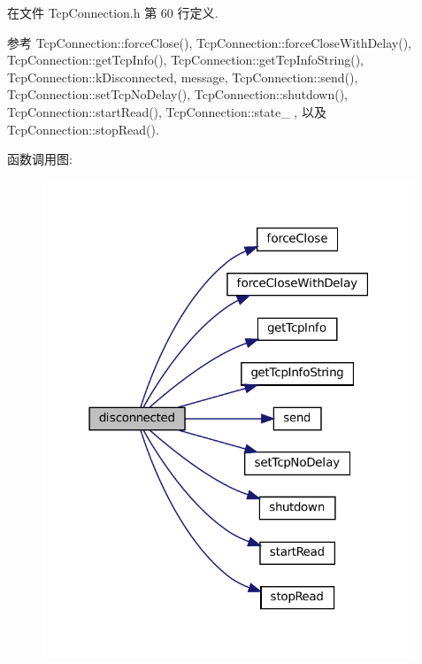 在文件 Tcp\+Connection.\+h 第 60 行定义.



参考 Tcp\+Connection\+::force\+Close(), Tcp\+Connection\+::force\+Close\+With\+Delay(), Tcp\+Connection\+::get\+Tcp\+Info(), Tcp\+Connection\+::get\+Tcp\+Info\+String(), Tcp\+Connection\+::k\+Disconnected, message, Tcp\+Connection\+::send(), Tcp\+Connection\+::set\+Tcp\+No\+Delay(), Tcp\+Connection\+::shutdown(), Tcp\+Connection\+::start\+Read(), Tcp\+Connection\+::state\+\_\+ , 以及 Tcp\+Connection\+::stop\+Read().

函数调用图\+:
\nopagebreak
\begin{figure}[H]
\begin{center}
\leavevmode
\includegraphics[width=316pt]{classmuduo_1_1net_1_1TcpConnection_a69413dc574470cdba5981d3e05250f7b_cgraph}
\end{center}
\end{figure}
\mbox{\label{classmuduo_1_1net_1_1TcpConnection_a0ba4cd267f7415c7ae91516b4545eda4}} 
